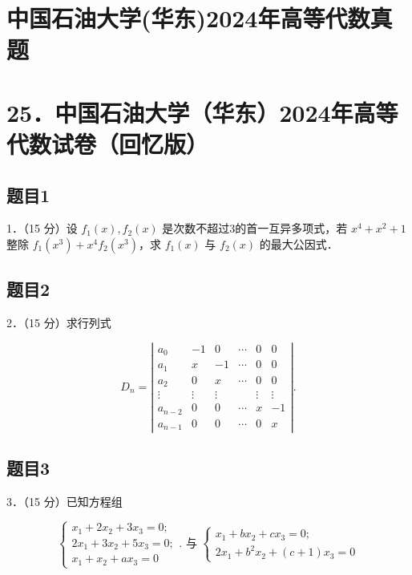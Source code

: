 \documentclass{article}
\begin{document}
\section*{中国石油大学(华东)2024年高等代数真题}
\section*{25．中国石油大学（华东）2024年高等代数试卷（回忆版）}

\subsection{题目1}
1．（15 分）设 \(f_{1}(x), f_{2}(x)\) 是次数不超过3的首一互异多项式，若 \(x^{4}+x^{2}+1\) 整除 \(f_{1}\left(x^{3}\right)+x^{4} f_{2}\left(x^{3}\right)\)，求 \(f_{1}(x)\) 与 \(f_{2}(x)\) 的最大公因式．

\subsection{题目2}
2．（15 分）求行列式

\[
D_{n}=\left|\begin{array}{cccccc}
a_{0} & -1 & 0 & \cdots & 0 & 0 \\
a_{1} & x & -1 & \cdots & 0 & 0 \\
a_{2} & 0 & x & \cdots & 0 & 0 \\
\vdots & \vdots & \vdots & & \vdots & \vdots \\
a_{n-2} & 0 & 0 & \cdots & x & -1 \\
a_{n-1} & 0 & 0 & \cdots & 0 & x
\end{array}\right| .
\]

\subsection{题目3}
3．（15 分）已知方程组

\[
\left\{\begin{array} { l } 
{ x _ { 1 } + 2 x _ { 2 } + 3 x _ { 3 } = 0 ; } \\
{ 2 x _ { 1 } + 3 x _ { 2 } + 5 x _ { 3 } = 0 ; } \\
{ x _ { 1 } + x _ { 2 } + a x _ { 3 } = 0 }
\end{array} . \text { 与 } \left\{\begin{array}{l}
x_{1}+b x_{2}+c x_{3}=0 ; \\
2 x_{1}+b^{2} x_{2}+(c+1) x_{3}=0
\end{array}\right.\right.
\]
\end{document}
